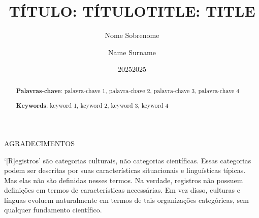 \begin{titlepage}
    \begin{center}
        {\large \MakeUppercase{Agradecimentos}}
    \end{center}
    \vspace{1cm}

    \lipsum[1-2]

\end{titlepage}

\begin{titlepage}
    \vspace*{\fill}
    \epigraph{`[R]egistros' são categorias culturais, não categorias científicas. Essas categorias podem ser descritas por suas características situacionais e linguísticas típicas. Mas elas não são definidas nesses termos. Na verdade, registros não possuem definições em termos de características necessárias. Em vez disso, culturas e línguas evoluem naturalmente em termos de tais organizações categóricas, sem qualquer fundamento científico.}{\textcite[p.~16]{biberWhatRegisterAccounting2023}}
\end{titlepage}


\title{\Large \MakeUppercase{Título: título}}
\author{Nome Sobrenome} %
\date{2025}
\maketitle
\renewcommand{\abstractname}{Resumo}
\begin{abstract}
    \lipsum[1]

    \vspace{1em}
    \textbf{Palavras-chave}: palavra-chave 1, palavra-chave 2, palavra-chave 3, palavra-chave 4
\end{abstract}


\title{\Large \MakeUppercase{Title: title}}
\author{Name Surname} %
\date{2025}
\maketitle
\begin{abstract}
    \lipsum[1]

    \vspace{1em}
    \textbf{Keywords}: keyword 1, keyword 2, keyword 3, keyword 4
\end{abstract}


\listoffigures
\thispagestyle{empty}
\listoftables
\thispagestyle{empty}
\tableofcontents
\thispagestyle{empty}
\clearpage
{}
\setcounter{page}{15} %
